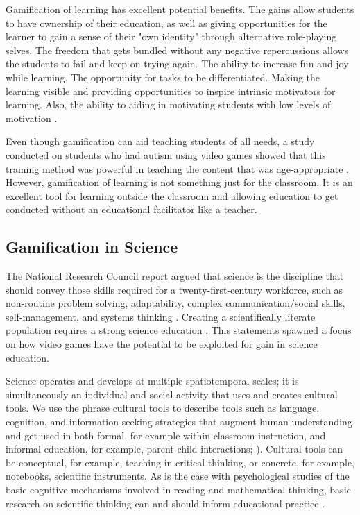 	Gamification of learning has excellent potential benefits. The gains allow students to have ownership of their education, as well as giving opportunities for the learner to gain a sense of their "own identity" through alternative role-playing selves. The freedom that gets bundled without any negative repercussions allows the students to fail and keep on trying again. The ability to increase fun and joy while learning. The opportunity for tasks to be differentiated. Making the learning visible and providing opportunities to inspire intrinsic motivators for learning. Also, the ability to aiding in motivating students with low levels of motivation \cite{22}. 
	
	Even though gamification can aid teaching students of all needs, a study conducted on students who had autism using video games showed that this training method was powerful in teaching the content that was age-appropriate \cite{26}. However, gamification of learning is not something just for the classroom. It is an excellent tool for learning outside the classroom and allowing education to get conducted without an educational facilitator like a teacher. 
	
	\subsection{Gamification in Science}
	\label{sec:game_in_science}
	The National Research Council report argued that science is the discipline that should convey those skills required for a twenty-first-century workforce, such as non-routine problem solving, adaptability, complex communication/social skills, self-management, and systems thinking \cite{national2010exploring}. Creating a scientifically literate population requires a strong science education \cite{morris2013gaming}. This statements spawned a focus on how video games have the potential to be exploited for gain in science education.
	
	Science operates and develops at multiple spatiotemporal scales; it is simultaneously an individual and social activity that uses and creates cultural tools. We use the phrase cultural tools \cite{weiner1995attribution} to describe tools such as language, cognition, and information-seeking strategies that augment human understanding and get used in both formal, for example within classroom instruction, and informal education, for example, parent-child interactions; \cite{rosas2003beyond}). Cultural tools can be conceptual, for example, teaching in critical thinking, or concrete, for example, notebooks, scientific instruments. As is the case with psychological studies of the basic cognitive mechanisms involved in reading and mathematical thinking, basic research on scientific thinking can and should inform educational practice \cite{morris2013gaming}.
	
